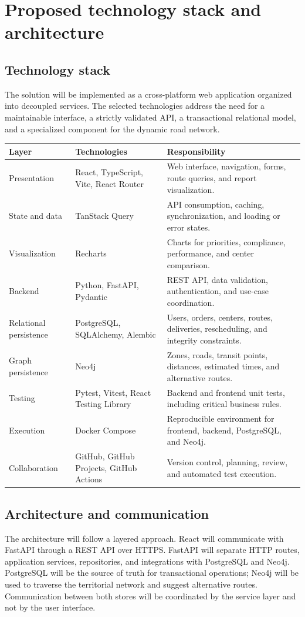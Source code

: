 \documentclass[12pt,a4paper]{article}
\begin{document}
\section{Proposed technology stack and architecture}

\subsection{Technology stack}
The solution will be implemented as a cross-platform web application organized into decoupled services. The selected technologies address the need for a maintainable interface, a strictly validated API, a transactional relational model, and a specialized component for the dynamic road network.

\begin{longtable}{p{}p{}p{}}
\toprule
\textbf{Layer} & \textbf{Technologies} & \textbf{Responsibility}\\
\midrule
Presentation & React, TypeScript, Vite, React Router & Web interface, navigation, forms, route queries, and report visualization.\\
State and data & TanStack Query & API consumption, caching, synchronization, and loading or error states.\\
Visualization & Recharts & Charts for priorities, compliance, performance, and center comparison.\\
Backend & Python, FastAPI, Pydantic & REST API, data validation, authentication, and use-case coordination.\\
Relational persistence & PostgreSQL, SQLAlchemy, Alembic & Users, orders, centers, routes, deliveries, rescheduling, and integrity constraints.\\
Graph persistence & Neo4j & Zones, roads, transit points, distances, estimated times, and alternative routes.\\
Testing & Pytest, Vitest, React Testing Library & Backend and frontend unit tests, including critical business rules.\\
Execution & Docker Compose & Reproducible environment for frontend, backend, PostgreSQL, and Neo4j.\\
Collaboration & GitHub, GitHub Projects, GitHub Actions & Version control, planning, review, and automated test execution.\\
\bottomrule
\end{longtable}

\subsection{Architecture and communication}
The architecture will follow a layered approach. React will communicate with FastAPI through a REST API over HTTPS. FastAPI will separate HTTP routes, application services, repositories, and integrations with PostgreSQL and Neo4j. PostgreSQL will be the source of truth for transactional operations; Neo4j will be used to traverse the territorial network and suggest alternative routes. Communication between both stores will be coordinated by the service layer and not by the user interface.
\end{document}

